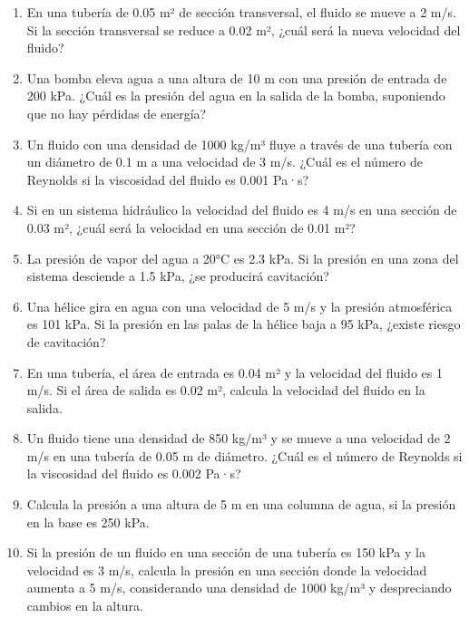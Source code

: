 \documentclass[../main]{subfiles}
\begin{document}
\begin{enumerate}
    \item En una tubería de 0.05 m² de sección transversal, el fluido se mueve a 2 m/s. Si la sección transversal se reduce a 0.02 m², ¿cuál será la nueva velocidad del fluido?
    \item Una bomba eleva agua a una altura de 10 m con una presión de entrada de 200 kPa. ¿Cuál es la presión del agua en la salida de la bomba, suponiendo que no hay pérdidas de energía?
    \item Un fluido con una densidad de 1000 kg/m³ fluye a través de una tubería con un diámetro de 0.1 m a una velocidad de 3 m/s. ¿Cuál es el número de Reynolds si la viscosidad del fluido es 0.001 Pa·s?
    \item Si en un sistema hidráulico la velocidad del fluido es 4 m/s en una sección de 0.03 m², ¿cuál será la velocidad en una sección de 0.01 m²?
    \item La presión de vapor del agua a 20°C es 2.3 kPa. Si la presión en una zona del sistema desciende a 1.5 kPa, ¿se producirá cavitación?
    \item Una hélice gira en agua con una velocidad de 5 m/s y la presión atmosférica es 101 kPa. Si la presión en las palas de la hélice baja a 95 kPa, ¿existe riesgo de cavitación?
    \item En una tubería, el área de entrada es 0.04 m² y la velocidad del fluido es 1 m/s. Si el área de salida es 0.02 m², calcula la velocidad del fluido en la salida.
    \item Un fluido tiene una densidad de 850 kg/m³ y se mueve a una velocidad de 2 m/s en una tubería de 0.05 m de diámetro. ¿Cuál es el número de Reynolds si la viscosidad del fluido es 0.002 Pa·s?
    \item Calcula la presión a una altura de 5 m en una columna de agua, si la presión en la base es 250 kPa.
    \item Si la presión de un fluido en una sección de una tubería es 150 kPa y la velocidad es 3 m/s, calcula la presión en una sección donde la velocidad aumenta a 5 m/s, considerando una densidad de 1000 kg/m³ y despreciando cambios en la altura.

\end{enumerate}
\end{document}
